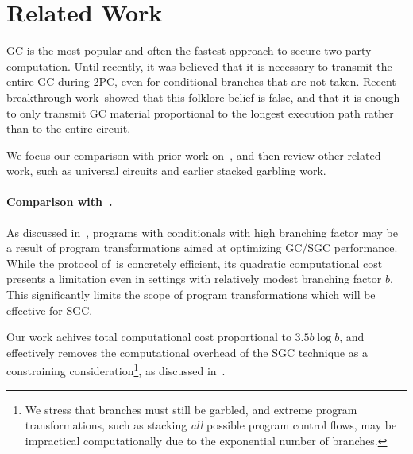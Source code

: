 \section{Related Work}\label{sec:relwork}


GC is the most popular and often the fastest approach to secure two-party computation.  Until recently, it was believed that it is necessary
to transmit the entire GC during 2PC, even for conditional branches that
are not taken.  Recent breakthrough work~\HK showed that this folklore belief is false, and that  it is enough to only transmit GC material  proportional to the
longest execution path rather than to the entire circuit.

We focus our comparison with prior work on~\HK, and then review other
related work, such as universal circuits and  earlier stacked garbling work.


\paragraph{Comparison with~\HK.} As discussed
in~, programs with conditionals with high
branching factor may be a result of program transformations aimed at
optimizing GC/SGC performance.  While the protocol of~\HK is
concretely efficient, its quadratic computational cost presents a
limitation even in settings with  relatively  modest branching factor
$b$.  This significantly limits the scope of program transformations
which will be effective for SGC.


Our work achives total computational cost proportional to $3.5 b \log
b$, and  effectively removes the computational overhead of the SGC
technique as a constraining consideration\footnote{We stress that
branches must still be garbled, and extreme program transformations,
such as stacking {\em all} possible program control flows, may be
impractical computationally due to the exponential number of
branches.}, as discussed in~. 

